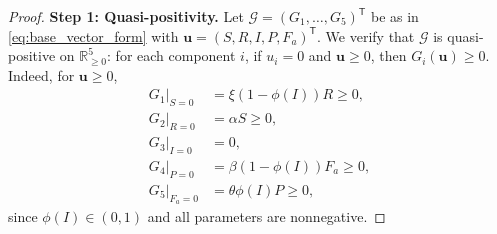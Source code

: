 \documentclass[10pt,a4paper]{amsart}
\begin{document}
\begin{proof}
\noindent\textbf{Step 1: Quasi-positivity.}
Let $\mathcal G=(G_1,\dots,G_5)^{\mathsf T}$ be as in \eqref{eq:base_vector_form} with $\mathbf u=(S,R,I,P,F_a)^{\mathsf T}$. 
We verify that $\mathcal G$ is quasi-positive on $\mathbb{R}^5_{\ge 0}$: for each component $i$, if $u_i=0$ and $\mathbf u\ge 0$, then $G_i(\mathbf u)\ge 0$. 
Indeed, for $\mathbf u\ge 0$,
\begin{align*}
G_1\big|_{S=0} &= \xi(1-\phi(I))R \ge 0,\\
G_2\big|_{R=0} &= \alpha S \ge 0,\\
G_3\big|_{I=0} &= 0,\\
G_4\big|_{P=0} &= \beta(1-\phi(I))F_a \ge 0,\\
G_5\big|_{F_a=0} &= \theta\phi(I)P \ge 0,
\end{align*}
since $\phi(I)\in(0,1)$ and all parameters are nonnegative.


\end{proof}
\end{document}

